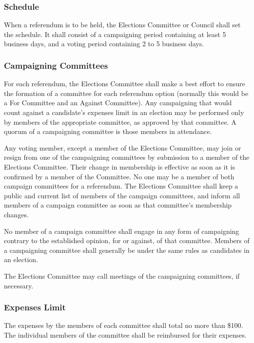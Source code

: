 \subsubsection{Schedule}
When a referendum is to be held, the Elections Committee or Council shall set the schedule.
It shall consist of a campaigning period containing at least 5 business days, and a voting period containing 2 to 5 business days.

\subsubsection{Campaigning Committees}
For each referendum, the Elections Committee shall make a best effort to ensure the formation of a committee for each referendum option (normally this would be a For Committee and an Against Committee).
Any campaigning that would count against a candidate's expenses limit in an election may be performed only by members of the appropriate committee, as approved by that committee.
A quorum of a campaigning committee is those members in attendance.

Any voting member, except a member of the Elections Committee, may join or resign from one of the campaigning committees by submission to a member of the Elections Committee.
Their change in membership is effective as soon as it is confirmed by a member of the Committee.
No one may be a member of both campaign committees for a referendum.
The Elections Committee shall keep a public and current list of members of the campaign committees, and inform all members of a campaign committee as soon as that committee's membership changes.

No member of a campaign committee shall engage in any form of campaigning contrary to the established opinion, for or against, of that committee.
Members of a campaigning committee shall generally be under the same rules as candidates in an election.

The Elections Committee may call meetings of the campaigning committees, if necessary.

\subsubsection{Expenses Limit}
The expenses by the members of each committee shall total no more than \$100.
The individual members of the committee shall be reimbursed for their expenses.
